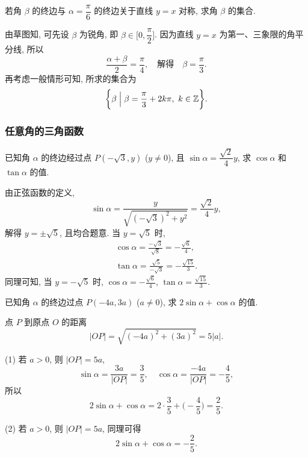 \begin{exercise}
    若角 $\beta$ 的终边与 $\alpha= \dfrac{\pi}6$ 的终边关于直线 $y=x$ 对称, 求角 $\beta$ 的集合.
\end{exercise}
\beginsolution
    由草图知, 可先设 $\beta$ 为锐角, 即 $\beta\in\biggl[0,\dfrac\pi2\biggr]$. 因为直线 $y=x$ 为第一、三象限的角平分线, 所以
    \[\frac{\alpha+ \beta}2= \frac{\pi}4,\quad
        \text{解得}\quad \beta= \frac\pi3.\]
    再考虑一般情形可知, 所求的集合为
    \[\biggl\{\beta\Bigm| \beta= \dfrac{\pi}3+ 2k\pi,\ 
        k\in\mathbb{Z}\biggr\}.\]
\endsolution

\subsubsection{任意角的三角函数}
\begin{example}
    已知角 $\alpha$ 的终边经过点 $P(-\sqrt3,y)$ ($y\neq0$), 且 $\sin\alpha =\dfrac{\sqrt2}4 y$, 求 $\cos \alpha$ 和 $\tan\alpha$ 的值.
\end{example}
\beginsolution
    由正弦函数的定义,
    \[\sin\alpha= \frac{y}{\sqrt{(-\sqrt3)^2+ y^2}}
        = \dfrac{\sqrt2}4 y,\]
    解得 $y= \pm\sqrt5$, 且均合题意. 当 $y=\sqrt5$ 时,
    \[\begin{gathered}
        \cos\alpha= \frac{-\sqrt3}{\sqrt8}
            = -\frac{\sqrt6}{4},\\
        \tan\alpha= \frac{\sqrt5}{-\sqrt3}
            = -\frac{\sqrt{15}}{3}.
    \end{gathered}\]
    同理可知, 当 $y= -\sqrt5$ 时, $\cos\alpha= -\frac{\sqrt6}{4}$, $\tan\alpha= \frac{\sqrt{15}}{3}$.
\endsolution

\lianxi
\begin{exercise}[s]
    已知角 $\alpha$ 的终边过点 $P(-4a,3a)$ ($a\neq0$), 求 $2\sin\alpha +\cos\alpha$ 的值.
\end{exercise}
\beginsolution
    点 $P$ 到原点 $O$ 的距离
    \[|OP|= \sqrt{(-4a)^2+ (3a)^2}= 5|a|.\]

    (1) 若 $a>0$, 则 $|OP|= 5a$, 
    \[\sin\alpha= \frac{3a}{|OP|}= \frac35,\quad
        \cos\alpha= \frac{-4a}{|OP|}= -\frac45,\]
    所以 
    \[2\sin\alpha +\cos\alpha
        = 2\cdot \frac35+ \biggl(-\frac45\biggr)
        = \frac25.\]

    (2) 若 $a>0$, 则 $|OP|= 5a$, 同理可得
    \[2\sin\alpha +\cos\alpha= -\frac25.\]
\endsolution

